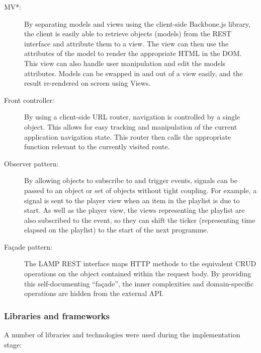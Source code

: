 \begin{description}
	\item[MV*:] By separating models and views using the client-side Backbone.js library, the client is easily able to retrieve objects (models) from the REST interface and attribute them to a view. The view can then use the attributes of the model to render the appropriate HTML in the DOM. This view can also handle user manipulation and edit the models attributes. Models can be swapped in and out of a view easily, and the result re-rendered on screen using Views.
	\item[Front controller:] By using a client-side URL router, navigation is controlled by a single object. This allows for easy tracking and manipulation of the current application navigation state. This router then calls the appropriate function relevant to the currently visited route.
	\item[Observer pattern:] By allowing objects to subscribe to and trigger events, signals can be passed to an object or set of objects without tight coupling. For example, a signal is sent to the player view when an item in the playlist is due to start. As well as the player view, the views representing the playlist are also subscribed to the event, so they can shift the ticker (representing time elapsed on the playlist) to the start of the next programme.
	\item[Fa\c{c}ade pattern:] The LAMP REST interface maps HTTP methods to the equivalent CRUD operations on the object contained within the request body. By providing this self-documenting ``fa\c{c}ade'', the inner complexities and domain-specific operations are hidden from the external API.
\end{description}

\subsubsection{Libraries and frameworks}

A number of libraries and technologies were used during the implementation stage:

